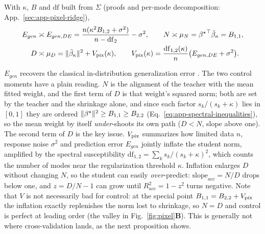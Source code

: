 \begin{prop}\label{prop:pixel-de}
With $\kappa$, $B$ and $\mathrm{df}$ built from $\Sigma$ (proofs and per-mode decomposition: App.~\ref{sec:app-pixel-ridge}),
\begin{equation}
\begin{aligned}
E_{gen}&\asymp E_{gen,DE}=\frac{n(\kappa^2B_{1,2}+\sigma^2)}{n-\mathrm{df}_2}-\sigma^2,\qquad
N\asymp \mu_N={\beta^{\star}}^\top\bar\beta_\kappa=B_{1,1},\\
D&\asymp \mu_D=\|\bar\beta_\kappa\|^2+V_{\rm pix}(\kappa),
\qquad
V_{\rm pix}(\kappa)=\frac{\mathrm{df}_{1,2}(\kappa)}{n}\big(E_{gen,DE}+\sigma^2\big).
\end{aligned}
\label{eq:pixel-de}
\end{equation}
\end{prop}
$E_{gen}$ recovers the classical in-distribution generalization error \citep{dobriban2018high,hastie2022surprises}. The two control moments have a plain reading. $N$ is the alignment of the teacher with the mean fitted weight, and the first term of $D$ is that weight's squared norm; both are set by the teacher and the shrinkage alone, and since each factor $s_k/(s_k+\kappa)$ lies in $[0,1]$ they are ordered $\|{\beta^{\star}}\|^2\ge B_{1,1}\ge B_{2,2}$ (Eq.~\ref{eq:app-spectral-inequalities}), so the mean weight by itself \emph{under}-shoots its own path ($D<N$, slope above one). The second term of $D$ is the key issue. $V_{\rm pix}$ summarizes how limited data $n$, response noise $\sigma^2$ and prediction error $E_{gen}$ jointly inflate the student norm, amplified by the spectral susceptibility $\mathrm{df}_{1,2}=\sum_ks_k/(s_k+\kappa)^2$, which counts the number of modes near the regularization threshold $\kappa$.
Inflation enlarges $D$ without changing $N$, so the student can easily \emph{over}-predict: $\mathrm{slope}_{acc}=N/D$ drops below one, and $z=D/N-1$ can grow until $R^2_{acc}=1-z^2$ turns negative.
Note that $V$ is not necessarily bad for control: at the special point $B_{1,1}=B_{2,2}+V_{\rm pix}$ the inflation exactly replenishes the norm lost to shrinkage, so $N=D$ and control is perfect at leading order (the valley in Fig.~\ref{fig:pixel}\textbf{B}).
This is generally not where cross-validation lands, as the next proposition shows.

